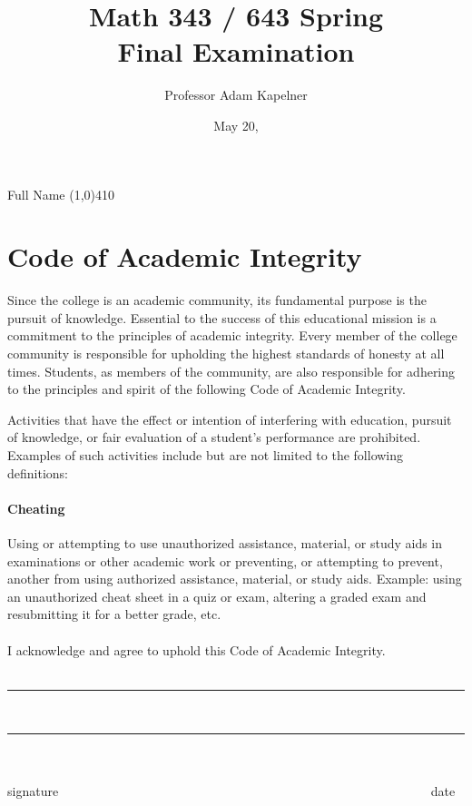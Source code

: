 \documentclass[tikz,12pt]{article}
\title{Math 343 / 643 Spring \the\year{} \\ Final Examination}
\author{Professor Adam Kapelner}
\date{May 20, \the\year{}}
\begin{document}
\maketitle

\noindent Full Name \line(1,0){410}

\thispagestyle{empty}

\section*{Code of Academic Integrity}

\footnotesize
Since the college is an academic community, its fundamental purpose is the pursuit of knowledge. Essential to the success of this educational mission is a commitment to the principles of academic integrity. Every member of the college community is responsible for upholding the highest standards of honesty at all times. Students, as members of the community, are also responsible for adhering to the principles and spirit of the following Code of Academic Integrity.

Activities that have the effect or intention of interfering with education, pursuit of knowledge, or fair evaluation of a student's performance are prohibited. Examples of such activities include but are not limited to the following definitions:

\paragraph{Cheating} Using or attempting to use unauthorized assistance, material, or study aids in examinations or other academic work or preventing, or attempting to prevent, another from using authorized assistance, material, or study aids. Example: using an unauthorized cheat sheet in a quiz or exam, altering a graded exam and resubmitting it for a better grade, etc.\\
\\
\noindent I acknowledge and agree to uphold this Code of Academic Integrity. \\~\\

\begin{center}
\rule{350px}{0.4pt}~~~~~~~\rule{80px}{0.4pt}~\\
~~~~~~~~~~~~~~~~~~~~~~~~~~~~~~~~~~~~~~~~~ signature~~~~~~~~~~~~~~~~~~~~~~~~~~~~~~~~~~~~~~~~~~~~~~~~~~~~~~~~~~ date
\end{center}

\normalsize
\end{document}
